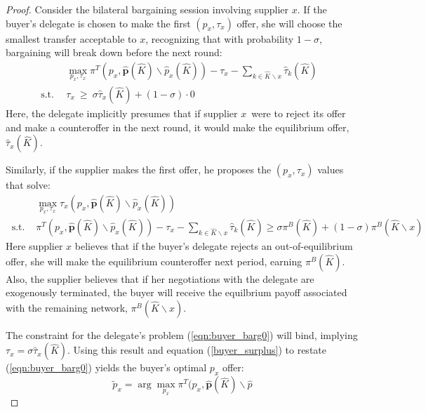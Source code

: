 \documentclass[12pt]{article} \usepackage{amsmath,amssymb,amsthm,geometry,graphicx,setspace,algorithm,algpseudocode,float}
\begin{document}
\begin{proof}
Consider the bilateral bargaining session involving supplier $x$. If the buyer's delegate is chosen to make the first $(p_{x},\tau _{x})$ offer, she will choose the smallest transfer acceptable to $x$, recognizing that with probability $1-\sigma$, bargaining will break down before the next round:
\begin{align}
&\max_{p_{x},\tau _{x}}\pi ^{T}(p_{x},\mathbf{\hat{p}}(\hat{K})\backslash 
\hat{p}_{x}(\hat{K}))-\tau _{x}-\sum_{k \in \hat{K}\backslash x}\hat{\tau%
}_{k}(\hat{K})\text{ } \label{eqn:buyer_barg0} \\ 
 \text{s.t.} \ \ &\tau _{x} \ \geq \ \sigma \hat{\tau}_{x}(\hat{K})+(1-\sigma )\cdot 0 \nonumber
\end{align}
Here, the delegate implicitly presumes that if supplier $x$\ were to reject its offer and make a counteroffer in the next round, it would make the equilibrium offer, $\hat{\tau}_{x}(\hat{K})$.
\par
Similarly, if the supplier makes the first offer, he proposes the $%
(p_{x},\tau _{x})$ values that solve:%
\begin{align}
&\max_{p_{x},\tau _{x}}\tau _{x}(p_{x},\mathbf{\hat{p}}(\hat{K})\backslash 
\hat{p}_{x}(\hat{K})) \label{eqn:seller_barg0} \\
\nonumber \
\text{s.t. \ \ }&\pi ^{T}(p_{x},\mathbf{\hat{p}}(\hat{K})\backslash \hat{p}_{x}(\hat{K}%
))-\tau _{x}-\sum_{k\in \hat{K}\backslash x}\hat{\tau}_{k}(\hat{K})\geq \sigma \pi ^{B}(\hat{K})+\left( 1-\sigma \right) \pi ^{B}(\hat{K}\backslash x) \nonumber
\end{align}
Here supplier $x$ believes that if the buyer's delegate rejects an out-of-equilibrium offer, she will make the equilibrium counteroffer next period, earning $\pi^{B}(\hat{K}).$ Also, the supplier believes that if her negotiations with the delegate are exogenously terminated, the buyer will receive the equilbrium payoff associated with the remaining network, $\pi ^{B}(\hat{K}\backslash x)$.
\par
The constraint for the delegate's problem (\ref{eqn:buyer_barg0}) will bind, implying $\tau _{x}=\sigma \hat{\tau}_{x}(\hat{K}).$ Using this result and equation (\ref{buyer_surplus}) to restate (\ref{eqn:buyer_barg0}) yields the buyer's optimal $p_x$ offer:
\begin{equation}
\tilde{p}_{x} =
\arg \max_{p_{x}}\pi ^{T}(p_{x},\mathbf{\hat{p}}(\hat{K})\backslash \hat{p}%

\end{equation}
\end{proof}
\end{document}
